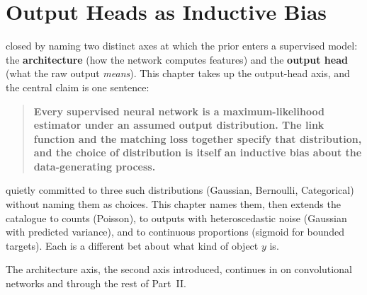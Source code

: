 
\chapter[Output Heads]{Output Heads as Inductive Bias}%
\label{ch:output-heads}

 closed by naming two distinct axes at which the
prior enters a supervised model: the \textbf{architecture} (how the
network computes features) and the \textbf{output head} (what the raw
output \emph{means}). This chapter takes up the output-head axis, and
the central claim is one sentence:

\begin{quote}
\textbf{Every supervised neural network is a maximum-likelihood
estimator under an assumed output distribution. The link function and
the matching loss together specify that distribution, and the choice of
distribution is itself an inductive bias about the data-generating
process.}
\end{quote}

 quietly committed to three such distributions
(Gaussian, Bernoulli, Categorical) without naming them as choices. This
chapter names them, then extends the catalogue to counts (Poisson), to
outputs with heteroscedastic noise (Gaussian with predicted variance),
and to continuous proportions (sigmoid for bounded targets). Each is a
different bet about what kind of object $y$ is.

The architecture axis, the second axis 
introduced, continues in  on convolutional networks and
through the rest of Part~II.








